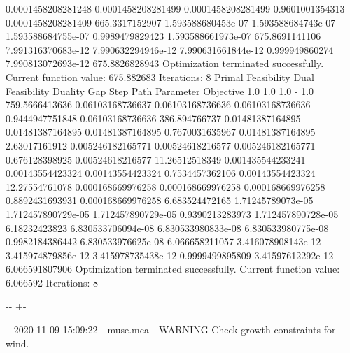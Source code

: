\documentclass[letterpaper,10pt,english]{sphinxmanual}
\newlength\nbsphinxcodecellspacing
\begin{document}
{\begin{sphinxVerbatim}[commandchars=\\\{\}]
0.0001458208281248  0.0001458208281499  0.0001458208281499  0.9601001354313  0.0001458208281409  665.3317152907
1.593588680453e-07  1.593588684743e-07  1.593588684755e-07  0.9989479829423  1.593588661973e-07  675.8691141106
7.991316370683e-12  7.990632294946e-12  7.990631661844e-12  0.999949860274   7.990813072693e-12  675.8826828943
Optimization terminated successfully.
         Current function value: 675.882683
         Iterations: 8
Primal Feasibility  Dual Feasibility    Duality Gap         Step             Path Parameter      Objective
1.0                 1.0                 1.0                 -                1.0                 759.5666413636
0.06103168736637    0.06103168736636    0.06103168736636    0.9444947751848  0.06103168736636    386.894766737
0.01481387164895    0.01481387164895    0.01481387164895    0.7670031635967  0.01481387164895    2.63017161912
0.005246182165771   0.00524618216577    0.005246182165771   0.676128398925   0.00524618216577    11.26512518349
0.001435544233241   0.00143554423324    0.00143554423324    0.7534457362106  0.00143554423324    12.27554761078
0.000168669976258   0.000168669976258   0.000168669976258   0.8892431693931  0.000168669976258   6.683524472165
1.71245789073e-05   1.712457890729e-05  1.712457890729e-05  0.9390213283973  1.712457890728e-05  6.18232423823
6.830533706094e-08  6.830533980833e-08  6.830533980775e-08  0.9982184386442  6.830533976625e-08  6.066658211057
3.416078908143e-12  3.415974879856e-12  3.415978735438e-12  0.9999499895809  3.41597612292e-12   6.066591807906
Optimization terminated successfully.
         Current function value: 6.066592
         Iterations: 8
\end{sphinxVerbatim}
}

{

\kern-\sphinxverbatimsmallskipamount\kern-\baselineskip
\kern+\FrameHeightAdjust\kern-\fboxrule
\vspace{\nbsphinxcodecellspacing}

\begin{sphinxVerbatim}[commandchars=\\\{\}]
-- 2020-11-09 15:09:22 - muse.mca - WARNING
Check growth constraints for wind.

\end{sphinxVerbatim}
}
\end{document}
